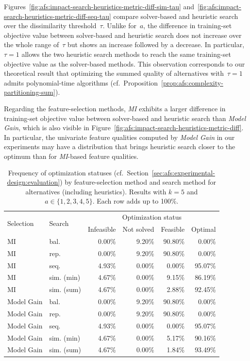 \documentclass{article}
\theoremstyle{definition}
\begin{document}
Figures~\ref{fig:afs:impact-search-heuristics-metric-diff-sim-tau} and~\ref{fig:afs:impact-search-heuristics-metric-diff-seq-tau} compare solver-based and heuristic search over the dissimilarity threshold~$\tau$.
Unlike for~$a$, the difference in training-set objective value between solver-based and heuristic search does not increase over the whole range of~$\tau$ but shows an increase followed by a decrease.
In particular, $\tau=1$ allows the two heuristic search methods to reach the same training-set objective value as the solver-based methods.
This observation corresponds to our theoretical result that optimizing the summed quality of alternatives with~$\tau=1$ admits polynomial-time algorithms (cf.~Proposition~\ref{prop:afs:complexity-partitioning-sum}).

Regarding the feature-selection methods, \emph{MI} exhibits a larger difference in training-set objective value between solver-based and heuristic search than \emph{Model Gain}, which is also visible in Figure~\ref{fig:afs:impact-search-heuristics-metric-diff}.
In particular, the univariate feature qualities computed by \emph{Model Gain} in our experiments may have a distribution that brings heuristic search closer to the optimum than for \emph{MI}-based feature qualities.

\begin{table}[t]
	\centering
	\begin{tabular}{llrrrr}
		\toprule
		\multirow{2}{*}{Selection} & \multirow{2}{*}{Search} & \multicolumn{4}{c}{Optimization status} \\
		\cmidrule(lr){3-6}
		& & Infeasible & Not solved & Feasible & Optimal \\
		\midrule
		MI & bal. & 0.00\% & 9.20\% & 90.80\% & 0.00\% \\
		MI & rep. & 0.00\% & 9.20\% & 90.80\% & 0.00\% \\
		MI & seq. & 4.93\% & 0.00\% & 0.00\% & 95.07\% \\
		MI & sim. (min) & 4.67\% & 0.00\% & 9.15\% & 86.19\% \\
		MI & sim. (sum) & 4.67\% & 0.00\% & 2.88\% & 92.45\% \\
		Model Gain & bal. & 0.00\% & 9.20\% & 90.80\% & 0.00\% \\
		Model Gain & rep. & 0.00\% & 9.20\% & 90.80\% & 0.00\% \\
		Model Gain & seq. & 4.93\% & 0.00\% & 0.00\% & 95.07\% \\
		Model Gain & sim. (min) & 4.67\% & 0.00\% & 5.17\% & 90.16\% \\
		Model Gain & sim. (sum) & 4.67\% & 0.00\% & 1.84\% & 93.49\% \\
		\bottomrule
	\end{tabular}
	\caption{
		Frequency of optimization statuses (cf.~Section~\ref{sec:afs:experimental-design:evaluation}) by feature-selection method and search method for alternatives (including heuristics).
		Results with $k=5$ and $a \in \{1,2,3,4,5\}$.
		Each row adds up to 100\%.
	}
	\label{tab:afs:impact-search-heuristics-fs-method-optimization-status}
\end{table}
\end{document}
